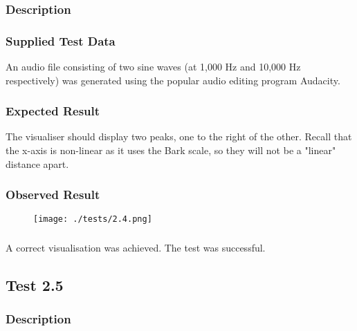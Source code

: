 \subsubsection{Description}
\paragraph{}
{
	\centering
}

\subsubsection{Supplied Test Data}
An audio file consisting of two sine waves (at 1,000 Hz and 10,000 Hz respectively) was generated using the popular audio editing program Audacity.

\subsubsection{Expected Result}
The visualiser should display two peaks, one to the right of the other. Recall that the x-axis is non-linear as it uses the Bark scale, so they will not be a "linear" distance apart.

\subsubsection{Observed Result}
\label{sec:evidence2.4}
\begin{figure}[H]
	\texttt{[image: ./tests/2.4.png]}
\end{figure}

\subsubsection{}
A correct visualisation was achieved. The test was successful.


\pagebreak
\subsection{Test 2.5}
\subsubsection{Description}
\paragraph{}
{
	\centering
}

